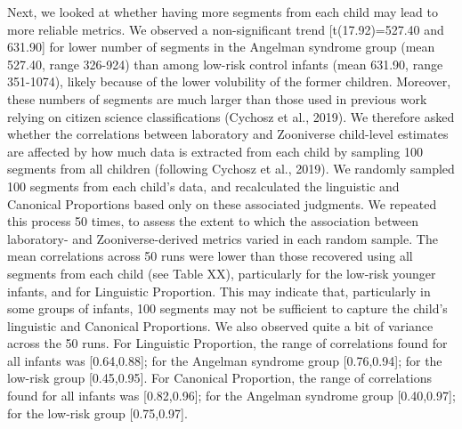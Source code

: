 \documentclass[english,,man,floatsintext]{apa6}
\begin{document}
Next, we looked at whether having more segments from each child may lead to more reliable metrics. We observed a non-significant trend {[}t(17.92)=527.40 and 631.90{]} for lower number of segments in the Angelman syndrome group (mean 527.40, range 326-924) than among low-risk control infants (mean 631.90, range 351-1074), likely because of the lower volubility of the former children. Moreover, these numbers of segments are much larger than those used in previous work relying on citizen science classifications (Cychosz et al., 2019). We therefore asked whether the correlations between laboratory and Zooniverse child-level estimates are affected by how much data is extracted from each child by sampling 100 segments from all children (following Cychosz et al., 2019). We randomly sampled 100 segments from each child's data, and recalculated the linguistic and Canonical Proportions based only on these associated judgments. We repeated this process 50 times, to assess the extent to which the association between laboratory- and Zooniverse-derived metrics varied in each random sample. The mean correlations across 50 runs were lower than those recovered using all segments from each child (see Table XX), particularly for the low-risk younger infants, and for Linguistic Proportion. This may indicate that, particularly in some groups of infants, 100 segments may not be sufficient to capture the child's linguistic and Canonical Proportions. We also observed quite a bit of variance across the 50 runs. For Linguistic Proportion, the range of correlations found for all infants was {[}0.64,0.88{]}; for the Angelman syndrome group {[}0.76,0.94{]}; for the low-risk group {[}0.45,0.95{]}. For Canonical Proportion, the range of correlations found for all infants was {[}0.82,0.96{]}; for the Angelman syndrome group {[}0.40,0.97{]}; for the low-risk group {[}0.75,0.97{]}.
\end{document}
